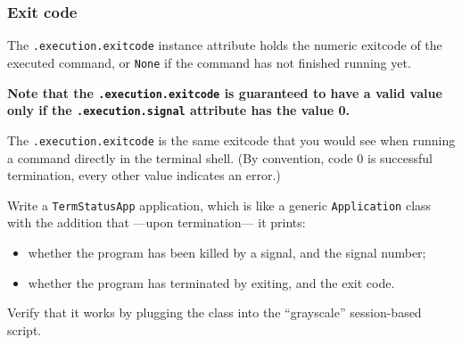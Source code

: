 \documentclass[english,serif,mathserif,xcolor=pdftex,dvipsnames,table]{beamer}
\begin{document}
\begin{frame}[fragile]
  \frametitle{Exit code}

  The \texttt{.execution.exitcode} instance attribute holds the
  numeric exitcode of the executed command, or \texttt{None} if the
  command has not finished running yet.

  \+
  {\bfseries Note that the \texttt{.execution.exitcode} is guaranteed
    to have a valid value only if the \texttt{.execution.signal}
    attribute has the value 0.}

  \+
  The \texttt{.execution.exitcode} is the same exitcode that you
  would see when running a command directly in the terminal shell. (By
  convention, code 0 is successful termination, every other value
  indicates an error.)
\end{frame}


\begin{frame}
  \begin{exercise*}[2.E]

    Write a \texttt{TermStatusApp} application, which is like a
    generic \texttt{Application} class with the addition that ---upon
    termination--- it prints:
    \begin{itemize}
    \item whether the program has been killed by a signal, and the signal number;
    \item whether the program has terminated by exiting, and the exit code.
    \end{itemize}

    Verify that it works by plugging the class into the ``grayscale''
    session-based script.
  \end{exercise*}
\end{frame}
\end{document}
